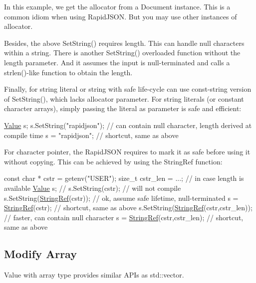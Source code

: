 In this example, we get the allocator from a {\ttfamily Document} instance. This is a common idiom when using Rapid\+J\+S\+ON. But you may use other instances of allocator.

Besides, the above {\ttfamily Set\+String()} requires length. This can handle null characters within a string. There is another {\ttfamily Set\+String()} overloaded function without the length parameter. And it assumes the input is null-\/terminated and calls a {\ttfamily strlen()}-\/like function to obtain the length.

Finally, for string literal or string with safe life-\/cycle can use const-\/string version of {\ttfamily Set\+String()}, which lacks allocator parameter. For string literals (or constant character arrays), simply passing the literal as parameter is safe and efficient\+:


\begin{DoxyCode}
\hyperlink{class_generic_value}{Value} s;
s.SetString(\textcolor{stringliteral}{"rapidjson"});    \textcolor{comment}{// can contain null character, length derived at compile time}
s = \textcolor{stringliteral}{"rapidjson"};             \textcolor{comment}{// shortcut, same as above}
\end{DoxyCode}


For character pointer, the Rapid\+J\+S\+ON requires to mark it as safe before using it without copying. This can be achieved by using the {\ttfamily String\+Ref} function\+:


\begin{DoxyCode}
\textcolor{keyword}{const} \textcolor{keywordtype}{char} * cstr = getenv(\textcolor{stringliteral}{"USER"});
\textcolor{keywordtype}{size\_t} cstr\_len = ...;                 \textcolor{comment}{// in case length is available}
\hyperlink{class_generic_value}{Value} s;
\textcolor{comment}{// s.SetString(cstr);                  // will not compile}
s.SetString(\hyperlink{struct_generic_string_ref_aa6b9fd9f6aa49405a574c362ba9af6b5}{StringRef}(cstr));          \textcolor{comment}{// ok, assume safe lifetime, null-terminated}
s = \hyperlink{struct_generic_string_ref_aa6b9fd9f6aa49405a574c362ba9af6b5}{StringRef}(cstr);                   \textcolor{comment}{// shortcut, same as above}
s.SetString(\hyperlink{struct_generic_string_ref_aa6b9fd9f6aa49405a574c362ba9af6b5}{StringRef}(cstr,cstr\_len)); \textcolor{comment}{// faster, can contain null character}
s = \hyperlink{struct_generic_string_ref_aa6b9fd9f6aa49405a574c362ba9af6b5}{StringRef}(cstr,cstr\_len);          \textcolor{comment}{// shortcut, same as above}
\end{DoxyCode}
\hypertarget{md_Commun_Externe_RapidJSON_doc_tutorial.zh-cn_ModifyArray}{}\subsection{Modify Array}\label{md_Commun_Externe_RapidJSON_doc_tutorial.zh-cn_ModifyArray}
Value with array type provides similar A\+P\+Is as {\ttfamily std\+::vector}.


